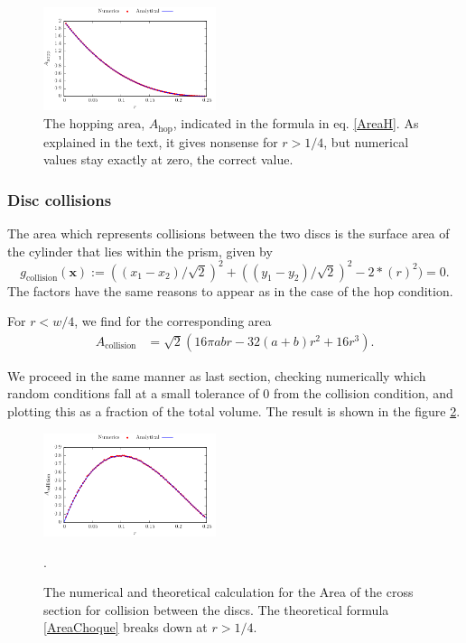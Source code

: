 \documentclass[superscriptaddress,pre,reprint,showpacs,onecolumn]{revtex4-1}
\begin{document}
\begin{figure}[h]
\centering
\includegraphics[width=0.45\textwidth]{./FigurasPerfectas/AreaHop02.pdf}
\caption{The hopping area, $A_\text{hop}$, 
  indicated in the formula in eq. \ref{AreaH}. As explained
in the text, it gives nonsense for $r>1/4$, but numerical values stay
exactly at zero, the correct value. } 
\label{AreaHopp01}
\end{figure}


\subsubsection{Disc collisions}

The area which represents collisions between the two discs is the surface area of the cylinder
that lies within the prism, given by
$$g_\text{collision}(\mathbf{x}) := ((x_1-x_2)/\sqrt{2})^2 + ((y_1-y_2)/\sqrt{2})^2
- 2*(r)^2) = 0.$$
The factors have the same reasons to appear as in the case of the hop condition.

For $r<w/4$, we find for the corresponding area
\begin{align}\label{AreaChoque}
A_\text{collision} & =  \sqrt{2} (
16\pi a b r -32 (a+b)r^2 +16 r^3).
\end{align}

We proceed in the same manner as last section, checking numerically which
random
conditions fall at a small tolerance of $0$ from the collision condition, and
plotting this as a fraction of the total volume. The result is shown in the
figure \ref{AreaChoqueTeoyNum}. 
\begin{figure}
\centering
\includegraphics[width=0.45\textwidth]{./FigurasPerfectas/AreaCol02.pdf}
\caption{The numerical and theoretical calculation for the Area of the cross section
for collision between the discs.  The theoretical formula 
\ref{AreaChoque} breaks down at
$r>1/4$.}
\label{AreaChoqueTeoyNum}.
\end{figure}
\end{document}
